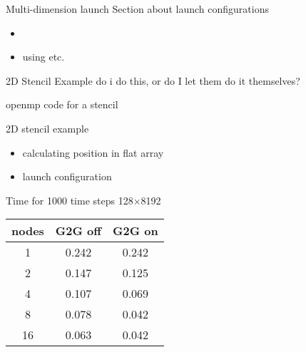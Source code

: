 
\begin{frame}[fragile]{}
    \begin{info}{Multi-dimension launch}
        Section about launch configurations
        \begin{itemize}
            \item {}
            \item using  etc.
        \end{itemize}
    \end{info}

\end{frame}

\begin{frame}[fragile]{2D Stencil Example}
    do i do this, or do I let them do it themselves?
    \begin{code}{openmp code for a stencil}
    \end{code}

\end{frame}

\begin{frame}[fragile]{}
    \begin{info}{2D stencil example}
        \begin{itemize}
            \item calculating position in flat array
            \item launch configuration
        \end{itemize}
    \end{info}

\end{frame}

\begin{frame}[fragile]{}
    \begin{info}{Time for 1000 time steps \@ 128$\times$8192}
        \begin{center}
            \begin{tabular}{ccc}
                \hline
                nodes   &   G2G off & G2G on \\
                 \hline
                 1      &   0.242   & 0.242  \\
                 2      &   0.147   & 0.125  \\
                 4      &   0.107   & 0.069  \\
                 8      &   0.078   & 0.042  \\
                16      &   0.063   & 0.042  \\
            \end{tabular}
        \end{center}
    \end{info}
\end{frame}

